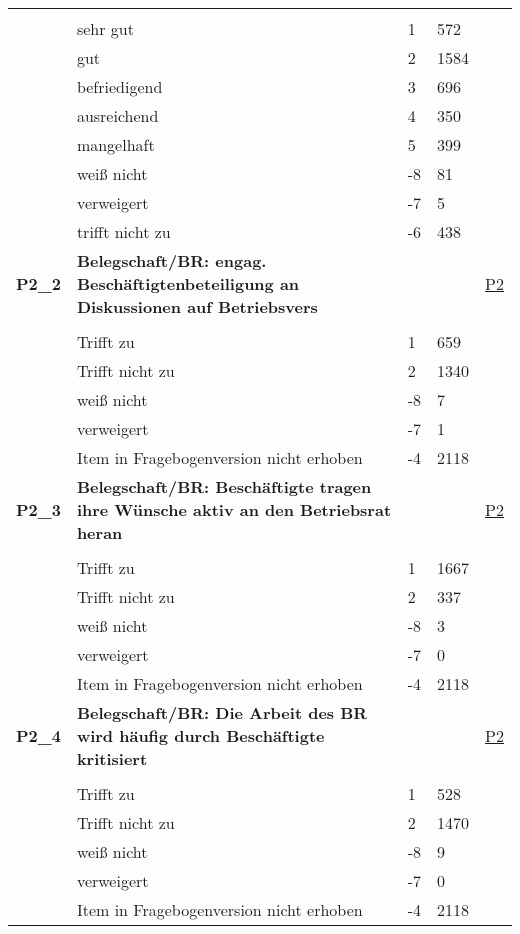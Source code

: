 \begin{longtable}{| L{2.5cm} | L{8.25cm}| C{1.5cm} | R{1.25cm} | C{2.25cm} |  }
   &  &  &  &  \\ 
   & sehr gut & 1 & 572 &  \\ 
   & gut & 2 & 1584 &  \\ 
   & befriedigend & 3 & 696 &  \\ 
   & ausreichend & 4 & 350 &  \\ 
   & mangelhaft & 5 & 399 &  \\ 
   & weiß nicht & -8 & 81 &  \\ 
   & verweigert & -7 & 5 &  \\ 
   & trifft nicht zu & -6 & 438 &  \\ 
   \midrule
\textbf{P2\_2}\label{var:suf:P2:2} & \textbf{Belegschaft/BR: engag. Beschäftigtenbeteiligung an Diskussionen auf Betriebsvers} &  &  & \hyperref[P2]{P2} \\ 
   &  &  &  &  \\ 
   & Trifft zu & 1 & 659 &  \\ 
   & Trifft nicht zu & 2 & 1340 &  \\ 
   & weiß nicht & -8 & 7 &  \\ 
   & verweigert & -7 & 1 &  \\ 
   & Item in Fragebogenversion nicht erhoben & -4 & 2118 &  \\ 
   \midrule
\textbf{P2\_3}\label{var:suf:P2:3} & \textbf{Belegschaft/BR: Beschäftigte tragen ihre Wünsche aktiv an den Betriebsrat heran} &  &  & \hyperref[P2]{P2} \\ 
   &  &  &  &  \\ 
   & Trifft zu & 1 & 1667 &  \\ 
   & Trifft nicht zu & 2 & 337 &  \\ 
   & weiß nicht & -8 & 3 &  \\ 
   & verweigert & -7 & 0 &  \\ 
   & Item in Fragebogenversion nicht erhoben & -4 & 2118 &  \\ 
   \midrule
\textbf{P2\_4}\label{var:suf:P2:4} & \textbf{Belegschaft/BR: Die Arbeit des BR wird häufig durch Beschäftigte kritisiert} &  &  & \hyperref[P2]{P2} \\ 
   &  &  &  &  \\ 
   & Trifft zu & 1 & 528 &  \\ 
   & Trifft nicht zu & 2 & 1470 &  \\ 
   & weiß nicht & -8 & 9 &  \\ 
   & verweigert & -7 & 0 &  \\ 
   & Item in Fragebogenversion nicht erhoben & -4 & 2118 &  \\ 

\end{longtable}
